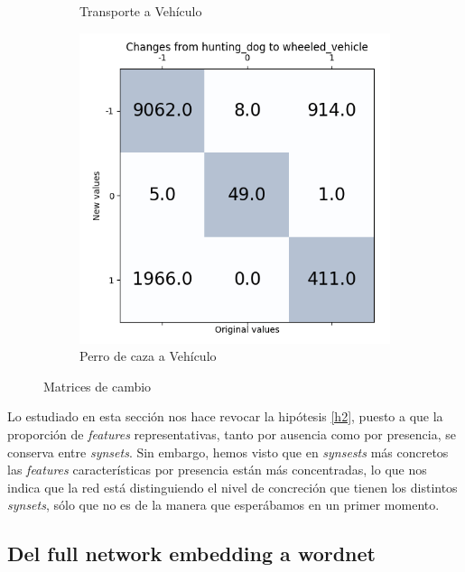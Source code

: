 \documentclass[12,twoside]{TFG-GM}
\theoremstyle{definition}
\theoremstyle{remark}
\begin{document}
\begin{figure}[ht]
\begin{subfigure}[b]{0.3\textwidth}
		\caption{Transporte a Vehículo \label{fig:matrixConveyanceWheel}}
	\end{subfigure}
	\begin{subfigure}[b]{0.3\textwidth}
		\includegraphics[width=\textwidth]  {Images/plots/25/matrices/matrixhuntingwheel.png}
		\caption{Perro de caza a Vehículo\label{fig:MatrixWheelHunt}}
	\end{subfigure}       
	\caption{Matrices de cambio\label{fig:matrixconcret}}
\end{figure}

Lo estudiado en esta sección nos hace revocar la hipótesis \ref{h2}, puesto a que la proporción de \textit{features} representativas, tanto por ausencia como por presencia, se conserva entre \textit{synsets}. Sin embargo, hemos visto que en \textit{synsests} más concretos las \textit{features} características por presencia están más concentradas, lo que nos indica que la red está distinguiendo el nivel de concreción que tienen los distintos \textit{synsets}, sólo que no es de la manera que esperábamos en un primer momento.

\subsection{Del full network embedding a wordnet} \label{subsec:fullnetworktowordnet}
\end{document}
